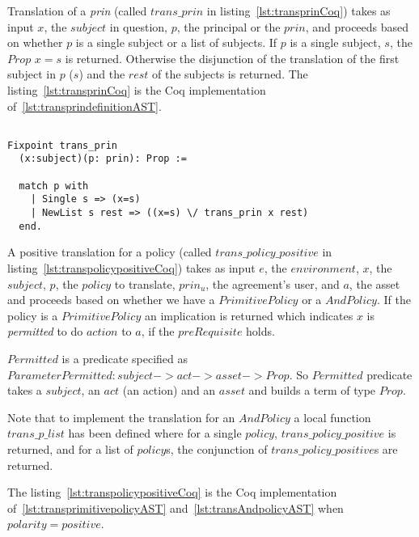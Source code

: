 Translation of a \emph{prin} (called $trans\_prin$ in listing~\ref{lst:transprinCoq}) takes as input $x$, the $subject$ in question, $p$, the principal or the $prin$,  and proceeds based on whether $p$ is a single subject or a list of subjects. If $p$ is a single subject, $s$, the $Prop$ $x=s$ is returned. Otherwise the disjunction of the translation of the first subject in $p$ ($s$) and the $rest$ of the subjects is returned.
The listing~\ref{lst:transprinCoq} is the Coq implementation of~\ref{lst:transprindefinitionAST}.


\begin{lstlisting}

Fixpoint trans_prin
  (x:subject)(p: prin): Prop :=

  match p with
    | Single s => (x=s)
    | NewList s rest => ((x=s) \/ trans_prin x rest)
  end.
\end{lstlisting}


A positive translation for a policy (called $trans\_policy\_positive$ in listing~\ref{lst:transpolicypositiveCoq}) takes as input $e$, the $environment$, $x$, the $subject$, $p$, the $policy$ to translate, $prin_{u}$, the agreement's user, and $a$, the asset and proceeds based on whether we have a $PrimitivePolicy$ or a $AndPolicy$. If the policy is a $PrimitivePolicy$ an implication is returned which indicates $x$ is \emph{permitted} to do $action$ to $a$, if the $preRequisite$ holds. 

$Permitted$ is a predicate specified as $Parameter Permitted : subject -> act -> asset -> Prop.$ So $Permitted$ predicate takes a $subject$, an $act$ (an action) and an $asset$ and builds a term of type $Prop$. 

Note that to implement the translation for an $AndPolicy$ a local function $trans\_p\_list$ has been defined where for a single $policy$, $trans\_policy\_positive$ is returned, and for a list of $policy$s, the conjunction of $trans\_policy\_positive$s are returned.

The listing~\ref{lst:transpolicypositiveCoq} is the Coq implementation of~\ref{lst:transprimitivepolicyAST} and~\ref{lst:transAndpolicyAST} when $polarity=positive$.

